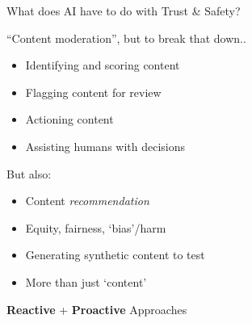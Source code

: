 \documentclass[nobackground,dvipsnames,table]{beamer}
\begin{document}
\begin{frame}{What does AI have to do with Trust \& Safety?}

“Content moderation”, but to break that down.. 
\begin{itemize}
    \item Identifying and scoring content
    \item Flagging content for review
    \item Actioning content
    \item Assisting humans with decisions
\end{itemize}

But also: 
\begin{itemize}
    \item Content \emph{recommendation}
    \item Equity, fairness, ‘bias’/harm
    \item Generating synthetic content to test
    \item More than just ‘content’ \newline 
\end{itemize}

\begin{center}
    \textbf{Reactive} + \textbf{Proactive} Approaches
\end{center}

\end{frame}
\end{document}
